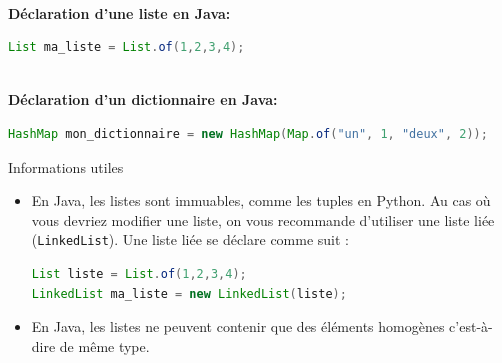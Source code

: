     \textbf{\\ Déclaration d'une liste en Java:}
    
    \begin{lstlisting}[language=Java]
List ma_liste = List.of(1,2,3,4); \end{lstlisting}
            
    \textbf{\\ Déclaration d'un dictionnaire en Java:} 
    
    \begin{lstlisting}[language=Java]
              HashMap mon_dictionnaire = new HashMap(Map.of("un", 1, "deux", 2)); \end{lstlisting}
              
    
    \begin{Example}{\faTerminal \quad Informations utiles}
        \begin{itemize}
            \item En Java, les listes sont immuables, comme les tuples en Python. Au cas où vous devriez modifier une liste, on vous recommande d'utiliser une liste liée (\lstinline{LinkedList}). Une liste liée se déclare comme suit :
    
            \begin{lstlisting}[language=Java]
List liste = List.of(1,2,3,4);
LinkedList ma_liste = new LinkedList(liste); \end{lstlisting}
            \item En Java, les listes ne peuvent contenir que des éléments homogènes c'est-à-dire de même type.
        \end{itemize} 
        
    \end{Example}
    
